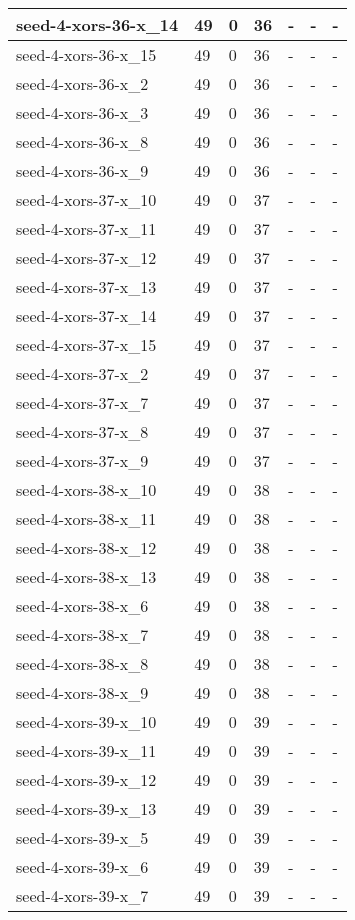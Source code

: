 \begin{scriptsize}
\begin{longtable}{|p{5cm}|l|l|l|l|l|l|}
seed-4-xors-36-x\_14&49&0&36&-&-&- \\ \hline 
seed-4-xors-36-x\_15&49&0&36&-&-&- \\ \hline 
seed-4-xors-36-x\_2&49&0&36&-&-&- \\ \hline 
seed-4-xors-36-x\_3&49&0&36&-&-&- \\ \hline 
seed-4-xors-36-x\_8&49&0&36&-&-&- \\ \hline 
seed-4-xors-36-x\_9&49&0&36&-&-&- \\ \hline 
seed-4-xors-37-x\_10&49&0&37&-&-&- \\ \hline 
seed-4-xors-37-x\_11&49&0&37&-&-&- \\ \hline 
seed-4-xors-37-x\_12&49&0&37&-&-&- \\ \hline 
seed-4-xors-37-x\_13&49&0&37&-&-&- \\ \hline 
seed-4-xors-37-x\_14&49&0&37&-&-&- \\ \hline 
seed-4-xors-37-x\_15&49&0&37&-&-&- \\ \hline 
seed-4-xors-37-x\_2&49&0&37&-&-&- \\ \hline 
seed-4-xors-37-x\_7&49&0&37&-&-&- \\ \hline 
seed-4-xors-37-x\_8&49&0&37&-&-&- \\ \hline 
seed-4-xors-37-x\_9&49&0&37&-&-&- \\ \hline 
seed-4-xors-38-x\_10&49&0&38&-&-&- \\ \hline 
seed-4-xors-38-x\_11&49&0&38&-&-&- \\ \hline 
seed-4-xors-38-x\_12&49&0&38&-&-&- \\ \hline 
seed-4-xors-38-x\_13&49&0&38&-&-&- \\ \hline 
seed-4-xors-38-x\_6&49&0&38&-&-&- \\ \hline 
seed-4-xors-38-x\_7&49&0&38&-&-&- \\ \hline 
seed-4-xors-38-x\_8&49&0&38&-&-&- \\ \hline 
seed-4-xors-38-x\_9&49&0&38&-&-&- \\ \hline 
seed-4-xors-39-x\_10&49&0&39&-&-&- \\ \hline 
seed-4-xors-39-x\_11&49&0&39&-&-&- \\ \hline 
seed-4-xors-39-x\_12&49&0&39&-&-&- \\ \hline 
seed-4-xors-39-x\_13&49&0&39&-&-&- \\ \hline 
seed-4-xors-39-x\_5&49&0&39&-&-&- \\ \hline 
seed-4-xors-39-x\_6&49&0&39&-&-&- \\ \hline 
seed-4-xors-39-x\_7&49&0&39&-&-&- \\ \hline 

\end{longtable}
\end{scriptsize}
